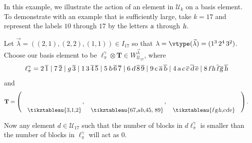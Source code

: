 \begin{example}
\label{big-example-of-action}
\def\aa{{\textsl a}}
\def\bb{{\textsl b}}
\def\cc{{\textsl c}}
\def\dd{{\textsl d}}
\def\ee{{\textsl e}}
\def\ff{{\textsl f}}
\def\gg{{\textsl g}}
\def\hh{{\textsl h}}
In this example, we illustrate the action of
an element in $\mathcal{U}_k$ on a basis element.
To demonstrate with an example that is
sufficiently large, take $k=17$ and represent the labels $10$ through $17$ by the letters
$\aa$ through $\hh$.

Let $\vec{\lambda} = ((2,1), (2,2), (1,1)) \in I_{17}$ so that $\lambda = \vtype(\vec{\lambda}) = (1^3 \, 2^4 \, 3^2)$.
Choose our basis element to be
$\ell^\gamma_\pi \otimes {\mathbf T} \in W^{\vec{\lambda}}_{\mathcal{U}_{17}}$,
where
\begin{equation*}
    \ell^\gamma_\pi = 
        2\, \overline{1} \mid 7\, \overline{2} \mid g\, \overline{3} \mid
        1\,3\,\overline{4}\,\overline{5} \mid 5\,\bb\, \overline{6}\,\overline{7} \mid 6\,\dd\,\overline{8}\,\overline{9} \mid
        9\,e\,\overline{\aa}\,\overline{\bb} \mid 4\,\aa\,\cc\,\overline{\cc}\,\overline{\dd}\,\overline{\ee} \mid
        8\,\ff\,\hh\,\overline{\ff}\,\overline{\gg}\,\overline{\hh}
\end{equation*}
and
\[
{\mathbf T} =
\left( \quad\raisebox{-.2in}{\tikztableau{{3},{1,2}}}\, , \quad
\raisebox{-.2in}{\tikztableau{{67,\aa\bb},{45, 89}}}\, , \quad
\raisebox{-.2in}{\tikztableau{{\ff\gg\hh},{\cc\dd\ee}}}\quad\right).
\]

Now any element $d \in \mathcal{U}_{17}$ such that the number of
blocks in $d \ell^\gamma_\pi$ is smaller than the number of blocks in
$\ell^\gamma_\pi$ will act as $0$.


\end{example}
